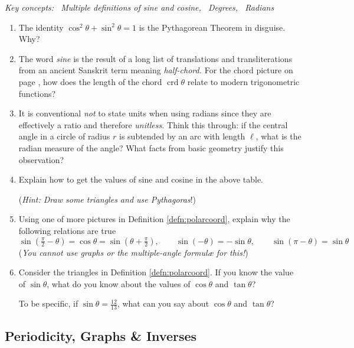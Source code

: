 \begin{exercises}
	\emph{Key concepts: \ Multiple definitions of sine and cosine, \ Degrees, \ Radians}

	\begin{enumerate}
	  \item The identity $\cos^2\!\theta+\sin^2\!\theta=1$ is the Pythagorean Theorem in disguise. Why?
	  
	  \item The word \emph{sine} is the result of a long list of translations and transliterations from an ancient Sanskrit term meaning \emph{half-chord.} For the chord picture on page \pageref{sec:trig}, how does the length of the chord $\operatorname{crd}\theta$ relate to modern trigonometric functions?
	
		\item It is conventional \emph{not} to state units when using radians since they are effectively a ratio and therefore \emph{unitless.} Think this through: if the central angle in a circle of radius $r$ is subtended by an arc with length $\ell$, what is the radian measure of the angle? What facts from basic geometry justify this observation?
		
	  \item Explain how to get the values of sine and cosine in the above table.\par
	  (\emph{Hint: Draw some triangles and use Pythagoras}!)
	  
	  \item\label{exs:trigshift} Using one of more pictures in Definition \ref{defn:polarcoord}, explain why the following relations are true
		\[
			\sin(\tfrac \pi 2-\theta)=\cos\theta=\sin(\theta+\tfrac\pi 2),
			\qquad 
			\sin(-\theta)=-\sin\theta,\qquad \sin(\pi-\theta)=\sin\theta
			\]
		(\emph{You cannot use graphs or the multiple-angle formulæ for this!})
	
	
		\item Consider the triangles in Definition \ref{defn:polarcoord}. If you know the value of $\sin\theta$, what do you know about the values of $\cos\theta$ and $\tan\theta$?\par
	To be specific, if $\sin\theta=\frac{12}{13}$, what can you say about $\cos\theta$ and $\tan\theta$?
	\end{enumerate}
\end{exercises}


\clearpage



\subsection{Periodicity, Graphs \& Inverses}\label{ssec:trigperiod}

